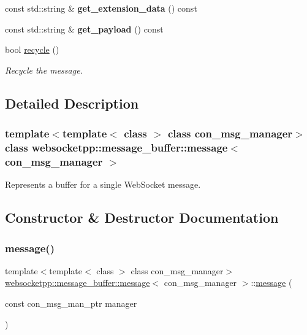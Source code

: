 \begin{DoxyCompactItemize}
const std\+::string \& {\bfseries get\+\_\+extension\+\_\+data} () const
\item 
\mbox{\label{classwebsocketpp_1_1message__buffer_1_1message_ac70e1d58b84c86adabfb5ed4b27bae6e}} 
const std\+::string \& {\bfseries get\+\_\+payload} () const
\item 
bool \mbox{\hyperlink{classwebsocketpp_1_1message__buffer_1_1message_a2c19e247389598d9f81c9447ddcfba51}{recycle}} ()
\begin{DoxyCompactList}\small\item\em Recycle the message. \end{DoxyCompactList}\end{DoxyCompactItemize}


\subsection{Detailed Description}
\subsubsection*{template$<$template$<$ class $>$ class con\+\_\+msg\+\_\+manager$>$\newline
class websocketpp\+::message\+\_\+buffer\+::message$<$ con\+\_\+msg\+\_\+manager $>$}

Represents a buffer for a single Web\+Socket message. 

\subsection{Constructor \& Destructor Documentation}
\mbox{\label{classwebsocketpp_1_1message__buffer_1_1message_ae3cb82d2876aebcf9909d87858e0f4af}} 
\subsubsection{\texorpdfstring{message()}{message()}}
{\footnotesize\ttfamily template$<$template$<$ class $>$ class con\+\_\+msg\+\_\+manager$>$ \\
\mbox{\hyperlink{classwebsocketpp_1_1message__buffer_1_1message}{websocketpp\+::message\+\_\+buffer\+::message}}$<$ con\+\_\+msg\+\_\+manager $>$\+::\mbox{\hyperlink{classwebsocketpp_1_1message__buffer_1_1message}{message}} (\begin{DoxyParamCaption}\item[{const con\+\_\+msg\+\_\+man\+\_\+ptr}]{manager }\end{DoxyParamCaption})\hspace{0.3cm}{\ttfamily [inline]}}



